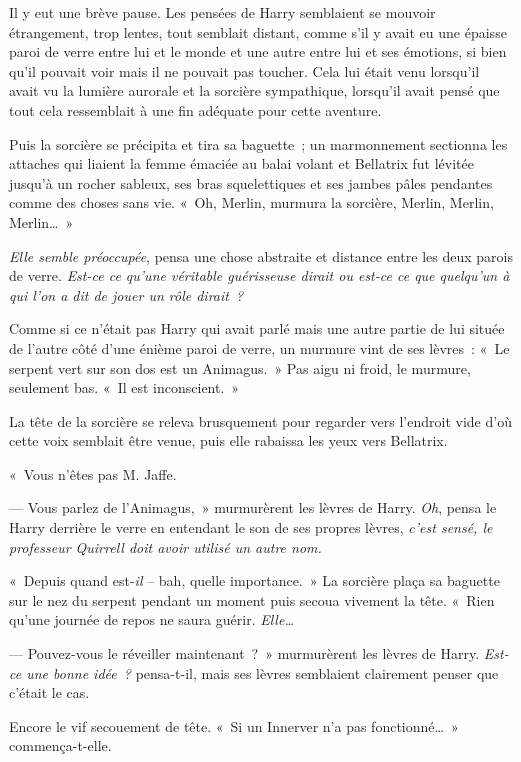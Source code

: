Il y eut une brève pause. Les pensées de Harry semblaient se mouvoir étrangement, trop lentes, tout semblait distant, comme s'il y avait eu une épaisse paroi de verre entre lui et le monde et une autre entre lui et ses émotions, si bien qu'il pouvait voir mais il ne pouvait pas toucher. Cela lui était venu lorsqu'il avait vu la lumière aurorale et la sorcière sympathique, lorsqu'il avait pensé que tout cela ressemblait à une fin adéquate pour cette aventure.

Puis la sorcière se précipita et tira sa baguette~; un marmonnement sectionna les attaches qui liaient la femme émaciée au balai volant et Bellatrix fut lévitée jusqu'à un rocher sableux, ses bras squelettiques et ses jambes pâles pendantes comme des choses sans vie. «~Oh, Merlin, murmura la sorcière, Merlin, Merlin, Merlin…~»

\emph{Elle semble préoccupée}, pensa une chose abstraite et distance entre les deux parois de verre. \emph{Est-ce ce qu'une véritable guérisseuse dirait ou est-ce ce que quelqu'un à qui l'on a dit de jouer un rôle dirait~?}

Comme si ce n'était pas Harry qui avait parlé mais une autre partie de lui située de l'autre côté d'une énième paroi de verre, un murmure vint de ses lèvres~: «~Le serpent vert sur son dos est un Animagus.~» Pas aigu ni froid, le murmure, seulement bas. «~Il est inconscient.~»

La tête de la sorcière se releva brusquement pour regarder vers l'endroit vide d'où cette voix semblait être venue, puis elle rabaissa les yeux vers Bellatrix.

«~Vous n'êtes pas M. Jaffe.

--- Vous parlez de l'Animagus,~» murmurèrent les lèvres de Harry. \emph{Oh}, pensa le Harry derrière le verre en entendant le son de ses propres lèvres, \emph{c'est sensé, le professeur Quirrell doit avoir utilisé un autre nom.}

«~Depuis quand est-\emph{il} -- bah, quelle importance.~» La sorcière plaça sa baguette sur le nez du serpent pendant un moment puis secoua vivement la tête. «~Rien qu'une journée de repos ne saura guérir. \emph{Elle…}

--- Pouvez-vous le réveiller maintenant~?~» murmurèrent les lèvres de Harry. \emph{Est-ce une bonne idée~?} pensa-t-il, mais ses lèvres semblaient clairement penser que c'était le cas.

Encore le vif secouement de tête. «~Si un Innerver n'a pas fonctionné…~» commença-t-elle.

